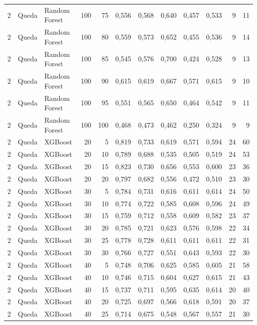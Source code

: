 \begin{longtable}{@{}rllrrrrrrrrr@{}}
2 & Queda & Random Forest & 100 & 75 & 0,556 & 0,568 & 0,640 & 0,457 & 0,533 & 9 & 11 \\
2 & Queda & Random Forest & 100 & 80 & 0,559 & 0,573 & 0,652 & 0,455 & 0,536 & 9 & 14 \\
2 & Queda & Random Forest & 100 & 85 & 0,545 & 0,576 & 0,700 & 0,424 & 0,528 & 9 & 13 \\
2 & Queda & Random Forest & 100 & 90 & 0,615 & 0,619 & 0,667 & 0,571 & 0,615 & 9 & 10 \\
2 & Queda & Random Forest & 100 & 95 & 0,551 & 0,565 & 0,650 & 0,464 & 0,542 & 9 & 11 \\
2 & Queda & Random Forest & 100 & 100 & 0,468 & 0,473 & 0,462 & 0,250 & 0,324 & 9 & 9 \\
2 & Queda & XGBoost & 20 & 5 & 0,819 & 0,733 & 0,619 & 0,571 & 0,594 & 24 & 60 \\
2 & Queda & XGBoost & 20 & 10 & 0,789 & 0,688 & 0,535 & 0,505 & 0,519 & 24 & 53 \\
2 & Queda & XGBoost & 20 & 15 & 0,823 & 0,730 & 0,656 & 0,553 & 0,600 & 23 & 36 \\
2 & Queda & XGBoost & 20 & 20 & 0,797 & 0,682 & 0,556 & 0,472 & 0,510 & 23 & 30 \\
2 & Queda & XGBoost & 30 & 5 & 0,784 & 0,731 & 0,616 & 0,611 & 0,614 & 24 & 50 \\
2 & Queda & XGBoost & 30 & 10 & 0,774 & 0,722 & 0,585 & 0,608 & 0,596 & 24 & 49 \\
2 & Queda & XGBoost & 30 & 15 & 0,759 & 0,712 & 0,558 & 0,609 & 0,582 & 23 & 37 \\
2 & Queda & XGBoost & 30 & 20 & 0,785 & 0,721 & 0,623 & 0,576 & 0,598 & 22 & 34 \\
2 & Queda & XGBoost & 30 & 25 & 0,778 & 0,728 & 0,611 & 0,611 & 0,611 & 22 & 31 \\
2 & Queda & XGBoost & 30 & 30 & 0,766 & 0,727 & 0,551 & 0,643 & 0,593 & 22 & 30 \\
2 & Queda & XGBoost & 40 & 5 & 0,748 & 0,706 & 0,625 & 0,585 & 0,605 & 21 & 58 \\
2 & Queda & XGBoost & 40 & 10 & 0,746 & 0,715 & 0,604 & 0,627 & 0,615 & 21 & 43 \\
2 & Queda & XGBoost & 40 & 15 & 0,737 & 0,711 & 0,595 & 0,635 & 0,614 & 20 & 40 \\
2 & Queda & XGBoost & 40 & 20 & 0,725 & 0,697 & 0,566 & 0,618 & 0,591 & 20 & 37 \\
2 & Queda & XGBoost & 40 & 25 & 0,714 & 0,675 & 0,548 & 0,567 & 0,557 & 21 & 30 \\

\end{longtable}
